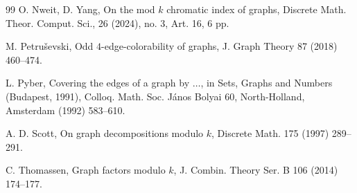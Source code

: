 \documentclass[11pt]{article}
\begin{document}
\begin{thebibliography}{99}
O. Nweit, D. Yang,
On the mod $k$ chromatic index of graphs,
Discrete Math. Theor. Comput. Sci., 26 (2024), no. 3,
Art. 16, 6 pp.

M. Petru\v{s}evski,
Odd $4$-edge-colorability of graphs,
J. Graph Theory 87 (2018) 460--474.

L. Pyber,
Covering the edges of a graph by $\ldots$,
in Sets, Graphs and Numbers (Budapest, 1991), Colloq. Math. Soc. J\'anos
Bolyai 60, North-Holland, Amsterdam (1992) 583--610.

A. D. Scott,
On graph decompositions modulo $k$,
Discrete Math. 175 (1997) 289--291.

C. Thomassen,
Graph factors modulo $k$,
J. Combin. Theory Ser. B 106 (2014) 174--177.

\end{thebibliography}
\end{document}
